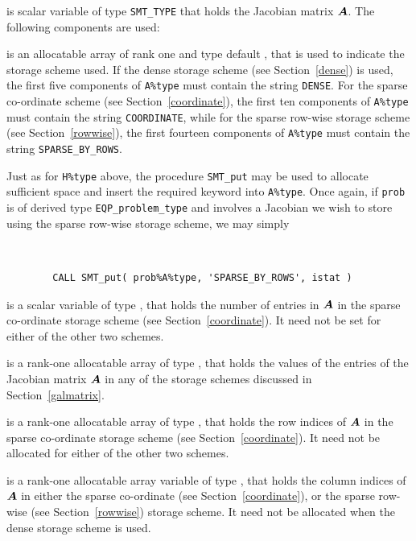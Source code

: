 \documentclass{galahad}
\newcommand{\packagename}{EQP}
\begin{document}
\begin{description}
 is scalar variable of type {\tt SMT\_TYPE} 
that holds the Jacobian matrix ${\bm{A}}$. The following components are used:

\begin{description}

 is an allocatable array of rank one and type default \character, that
is used to indicate the storage scheme used. If the dense storage scheme 
(see Section~\ref{dense}) is used, 
the first five components of {\tt A\%type} must contain the
string {\tt DENSE}.
For the sparse co-ordinate scheme (see Section~\ref{coordinate}), 
the first ten components of {\tt A\%type} must contain the
string {\tt COORDINATE}, while 
for the sparse row-wise storage scheme (see Section~\ref{rowwise}),
the first fourteen components of {\tt A\%type} must contain the
string {\tt SPARSE\_BY\_ROWS}.

Just as for {\tt H\%type} above, the procedure {\tt SMT\_put} 
may be used to allocate sufficient space and insert the required keyword
into {\tt A\%type}.
Once again, if {\tt prob} is of derived type {\tt \packagename\_problem\_type}
and involves a Jacobian we wish to store using the sparse row-wise 
storage scheme, we may simply
{\tt 
\begin{verbatim}
        CALL SMT_put( prob%A%type, 'SPARSE_BY_ROWS', istat )
\end{verbatim}
}
\noindent

 is a scalar variable of type \integer, that 
holds the number of entries in ${\bm{A}}$
in the sparse co-ordinate storage scheme (see Section~\ref{coordinate}). 
It need not be set for either of the other two schemes.

 is a rank-one allocatable array of type \realdp, that holds
the values of the entries of the Jacobian matrix ${\bm{A}}$ in any of the 
storage schemes discussed in Section~\ref{galmatrix}.

 is a rank-one allocatable array of type \integer,
that holds the row indices of ${\bm{A}}$ in the sparse co-ordinate storage
scheme (see Section~\ref{coordinate}). 
It need not be allocated for either of the other two schemes.

 is a rank-one allocatable array variable of type \integer,
that holds the column indices of ${\bm{A}}$ in either the sparse co-ordinate 
(see Section~\ref{coordinate}), or the sparse row-wise 
(see Section~\ref{rowwise}) storage scheme.
It need not be allocated when the dense storage scheme is used.


\end{description}
\end{description}
\end{document}
